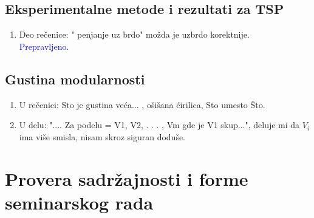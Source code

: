 \documentclass[a4paper]{report}
\newcommand{\odgovor}[1]{\textcolor{blue}{#1}}
\begin{document}
\subsection{Eksperimentalne metode i rezultati za TSP}
\begin{enumerate}
  \item Deo rečenice: " penjanje uz brdo" možda je uzbrdo korektnije. \\
  \odgovor{ Prepravljeno.}
  
\end{enumerate}

\subsection{Gustina modularnosti}
\begin{enumerate}
  \item U  rečenici: Sto je gustina veća... , ošišana ćirilica, Sto umesto Što.
  \item U delu: ".... Za podelu  = {V1, V2, . . . , Vm} gde je V1 skup...", deluje mi da $V_i$ ima više smisla, nisam skroz siguran doduše.
\end{enumerate}



\section{Provera sadržajnosti i forme seminarskog rada}
\end{document}
